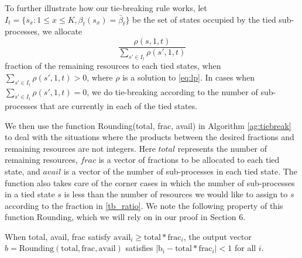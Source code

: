To further illustrate how our tie-breaking rule works, let $I_t= \{s_x:1\leq x\leq K,\beta_t(s_x)=\bar{\beta}_t\}$ be the set of states occupied by the tied sub-processes, we allocate \begin{equation}\label{tb_ratio}
\frac{\rho(s,1,t)}{\sum_{s'\in I_t}\rho(s',1,t)}
\end{equation} fraction of the remaining resources to each tied states, when $\sum_{s'\in I_t}\rho(s',1,t)>0$, where $\rho$ is a solution to \eqref{eq:lp}. 
In cases when $\sum_{s'\in I_t}\rho(s',1,t)=0$, we do tie-breaking according to the number of sub-processes that are currently in each of the tied states. 

We then use the function Rounding(total, frac, avail) in Algorithm \ref{ag:tiebreak} to deal with the situations where the products between the desired fractions and remaining resources are not integers. Here $total$ represents the number of remaining resources, $frac$ is a vector of fractions to be allocated to each tied state, and $avail$ is a vector of the number of sub-processes in each tied state. The function also takes care of the corner cases in which the number of sub-processes in a tied state $s$ is less than the number of resources we would like to assign to $s$ according to the fraction in \eqref{tb_ratio}. We note the following property of this function Rounding, which we will rely on in our proof in Section 6.

\begin{remark}
\label{remark:rounding}
When total, avail, frac satisfy $\text{avail}_i\geq \text{total} * \text{frac}_i$, the output vector $b=\text{Rounding}(\text{total},\text{frac},\text{avail})$ satisfies $|\text{b}_i-\text{total} * \text{frac}_i|<1$ for all $i$.
\end{remark}


